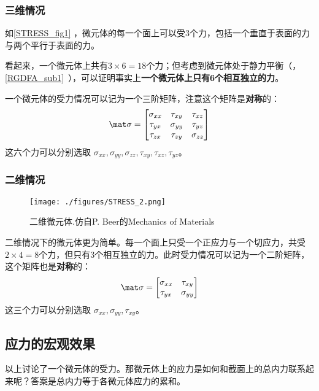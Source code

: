 \subsubsection{三维情况}
如\autoref{STRESS_fig1} ，微元体的每一个面上可以受3个力，包括一个垂直于表面的力与两个平行于表面的力。

看起来，一个微元体上共有$3\times6=18$个力；但考虑到微元体处于静力平衡（，\autoref{RGDFA_sub1}~），可以证明事实上\textbf{一个微元体上只有6个相互独立的力}。

一个微元体的受力情况可以记为一个三阶矩阵，注意这个矩阵是\textbf{对称}的：
\begin{equation}
\mat \sigma=
\begin{bmatrix}
\sigma_{xx} & \tau_{xy} & \tau_{xz} \\
\tau_{yx} & \sigma_{yy} & \tau_{yz} \\
\tau_{zx} & \tau_{zy} & \sigma_{zz} \\
\end{bmatrix}
\end{equation}
这六个力可以分别选取 $\sigma_{xx}, \sigma_{yy},\sigma_{zz}, \tau_{xy}, \tau_{xz},  \tau_{yz}$。

\subsubsection{二维情况}
\begin{figure}[ht]
\centering
\texttt{[image: ./figures/STRESS\_2.png]}
\caption{二维微元体.仿自P. Beer的Mechanics of Materials} \label{STRESS_fig2}
\end{figure}

二维情况下的微元体更为简单。每一个面上只受一个正应力与一个切应力，共受$2\times4=8$个力，但只有3个相互独立的力。此时受力情况可以记为一个二阶矩阵，这个矩阵也是\textbf{对称}的：
\begin{equation}
\mat \sigma=
\begin{bmatrix}
\sigma_{xx} & \tau_{xy}\\
\tau_{yx} & \sigma_{yy}\\
\end{bmatrix}
\end{equation}
这三个力可以分别选取 $\sigma_{xx}, \sigma_{yy}, \tau_{xy}$。

\subsection{应力的宏观效果}
以上讨论了一个微元体的受力。那微元体上的应力是如何和截面上的总内力联系起来呢？答案是总内力等于各微元体应力的累和。

